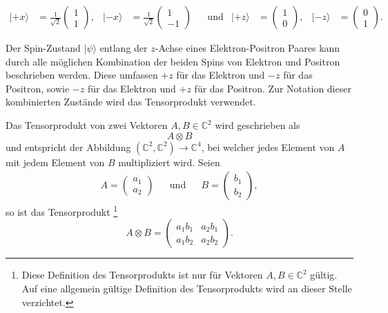 \begin{refsection}
\begin{align}
    |{+}x\rangle &= \frac{1}{\sqrt{2}}\begin{pmatrix} 1\\1 \end{pmatrix}, &
    |{-}x\rangle &= \frac{1}{\sqrt{2}}\begin{pmatrix} 1\\-1 \end{pmatrix} &
    & \text{und} & 
    |{+}z\rangle &= \begin{pmatrix} 1\\0 \end{pmatrix}, &
    |{-}z\rangle &= \begin{pmatrix} 0\\1 \end{pmatrix}. &
\end{align}

Der Spin-Zustand $|\psi\rangle$ entlang der $z$-Achse eines 
Elektron-Positron Paares  kann durch alle m\"oglichen Kombination der beiden
Spins von Elektron und Positron beschrieben werden. 
Diese umfassen $+z$ f\"ur das Elektron und $-z$
f\"ur das Positron, sowie $-z$ f\"ur das Elektron und $+z$ f\"ur das Positron.
Zur Notation dieser kombinierten Zust\"ande wird das Tensorprodukt verwendet.

\begin{definition}\label{def:bell:tensorprodukt}
    Das Tensorprodukt von zwei Vektoren $A,B \in \mathbb{C}^2$  wird geschrieben als
    \[
        A \otimes B
    \]
    und entspricht der Abbildung $(\mathbb{C}^2,\mathbb{C}^2)\to\mathbb{C}^4$, 
    bei welcher jedes Element von $A$ mit jedem Element von $B$ multipliziert
    wird.
    Seien
    \begin{align*}
        A = \begin{pmatrix} a_{1} \\ a_{2} \end{pmatrix}
        && \text{und} &&
        B = \begin{pmatrix} b_{1} \\ b_{2} \end{pmatrix},
    \end{align*}
    so ist das Tensorprodukt 
    \footnote{Diese Definition des Tensorprodukts ist nur f\"ur Vektoren
        $A,B \in \mathbb{C}^2$ g\"ultig. Auf eine allgemein g\"ultige Definition
        des Tensorprodukts wird an dieser Stelle verzichtet.}
    \[
        A \otimes B = \begin{pmatrix} 
        a_1 b_1 & a_2 b_1 \\ a_1 b_2 & a_2 b_2
        \end{pmatrix}.
    \]
\end{definition}


\end{refsection}
